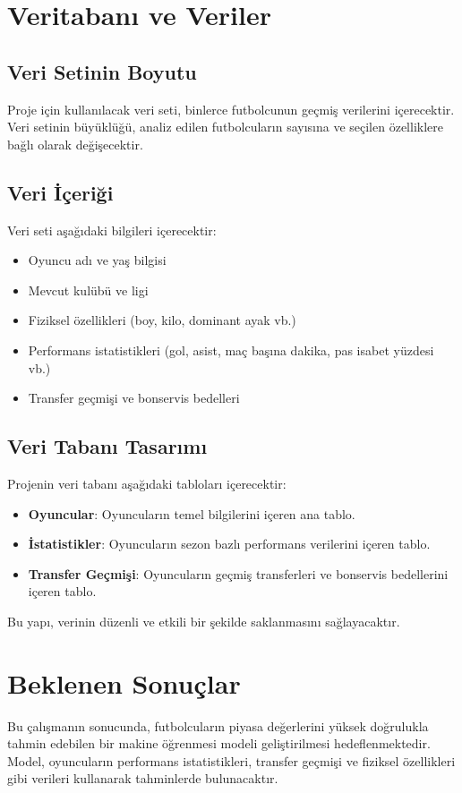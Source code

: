 \documentclass{article}
\begin{document}
\section{Veritabanı ve Veriler}
\subsection{Veri Setinin Boyutu}
Proje için kullanılacak veri seti, binlerce futbolcunun geçmiş verilerini içerecektir. Veri setinin büyüklüğü, analiz edilen futbolcuların sayısına ve seçilen özelliklere bağlı olarak değişecektir.

\subsection{Veri İçeriği}
Veri seti aşağıdaki bilgileri içerecektir:
\begin{itemize}
    \item Oyuncu adı ve yaş bilgisi
    \item Mevcut kulübü ve ligi
    \item Fiziksel özellikleri (boy, kilo, dominant ayak vb.)
    \item Performans istatistikleri (gol, asist, maç başına dakika, pas isabet yüzdesi vb.)
    \item Transfer geçmişi ve bonservis bedelleri
\end{itemize}

\subsection{Veri Tabanı Tasarımı}
Projenin veri tabanı aşağıdaki tabloları içerecektir:
\begin{itemize}
    \item \textbf{Oyuncular}: Oyuncuların temel bilgilerini içeren ana tablo.
    \item \textbf{İstatistikler}: Oyuncuların sezon bazlı performans verilerini içeren tablo.
    \item \textbf{Transfer Geçmişi}: Oyuncuların geçmiş transferleri ve bonservis bedellerini içeren tablo.
\end{itemize}
Bu yapı, verinin düzenli ve etkili bir şekilde saklanmasını sağlayacaktır.

\section{Beklenen Sonuçlar}
Bu çalışmanın sonucunda, futbolcuların piyasa değerlerini yüksek doğrulukla tahmin edebilen bir makine öğrenmesi modeli geliştirilmesi hedeflenmektedir. Model, oyuncuların performans istatistikleri, transfer geçmişi ve fiziksel özellikleri gibi verileri kullanarak tahminlerde bulunacaktır.
\end{document}
